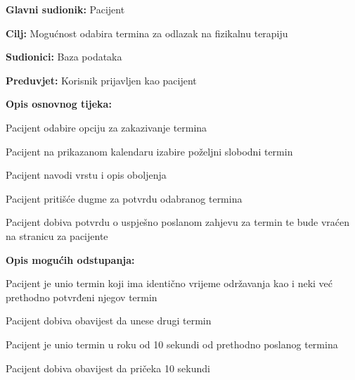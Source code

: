 \noindent {}
\begin{packed_item}
	
	\item \textbf{Glavni sudionik: }Pacijent
	\item  \textbf{Cilj:} Mogućnost odabira termina za odlazak na fizikalnu terapiju
	\item  \textbf{Sudionici:} Baza podataka
	\item  \textbf{Preduvjet:} Korisnik prijavljen kao pacijent
	\item  \textbf{Opis osnovnog tijeka:}
	
	\item[] \begin{packed_enum}
		
		\item Pacijent odabire opciju za zakazivanje termina
		\item Pacijent na prikazanom kalendaru izabire poželjni slobodni termin
		\item Pacijent navodi vrstu i opis oboljenja
		\item Pacijent pritišće dugme za potvrdu odabranog termina
		\item Pacijent dobiva potvrdu o uspješno poslanom zahjevu za termin te bude vraćen na stranicu za pacijente
	\end{packed_enum}
	
	\item  \textbf{Opis mogućih odstupanja:}
	
	\item[] \begin{packed_item}
		
		\item[2.a] Pacijent je unio termin koji ima identično vrijeme održavanja kao i neki već prethodno potvrđeni njegov termin
		\item[] \begin{packed_enum}
			
			\item Pacijent dobiva obavijest da unese drugi termin
			
		\end{packed_enum}
		
		
		\item[2.b] Pacijent je unio termin u roku od 10 sekundi od prethodno poslanog termina
		\item[] \begin{packed_enum}
			
			\item Pacijent dobiva obavijest da pričeka 10 sekundi
			

\end{packed_enum}
\end{packed_item}
\end{packed_item}
